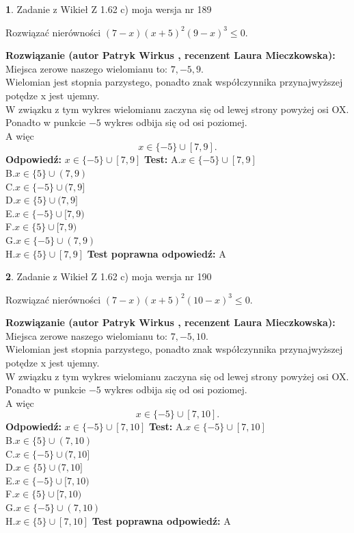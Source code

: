 \documentclass[12pt, a4paper]{article}
\theoremstyle{definition} %
\newtheorem{zad}{}
\newcommand{\zadStart}[1]{\begin{zad}#1\newline}
\newcommand{\zadStop}{\end{zad}}
\newcommand{\rozwStart}[2]{\noindent \textbf{Rozwiązanie (autor #1 , recenzent #2): }\newline}
\newcommand{\rozwStop}{\newline}
\newcommand{\odpStart}{\noindent \textbf{Odpowiedź:}\newline}
\newcommand{\odpStop}{\newline}
\newcommand{\testStart}{\noindent \textbf{Test:}\newline}
\newcommand{\testStop}{\newline}
\newcommand{\kluczStart}{\noindent \textbf{Test poprawna odpowiedź:}\newline}
\newcommand{\kluczStop}{\newline}
\begin{document}
\zadStart{Zadanie z Wikieł Z 1.62 c) moja wersja nr 189}

Rozwiązać nierówności $(7-x)(x+5)^{2}(9-x)^{3}\le0$.
\zadStop
\rozwStart{Patryk Wirkus}{Laura Mieczkowska}
Miejsca zerowe naszego wielomianu to: $7, -5, 9$.\\
Wielomian jest stopnia parzystego, ponadto znak współczynnika przy\linebreak najwyższej potędze x jest ujemny.\\ W związku z tym wykres wielomianu zaczyna się od lewej strony powyżej osi OX.\\
Ponadto w punkcie $-5$ wykres odbija się od osi poziomej.\\
A więc $$x \in \{-5\} \cup [7,9].$$
\rozwStop
\odpStart
$x \in \{-5\} \cup [7,9]$
\odpStop
\testStart
A.$x \in \{-5\} \cup [7,9]$\\
B.$x \in \{5\} \cup (7,9)$\\
C.$x \in \{-5\} \cup (7,9]$\\
D.$x \in \{5\} \cup (7,9]$\\
E.$x \in \{-5\} \cup [7,9)$\\
F.$x \in \{5\} \cup [7,9)$\\
G.$x \in \{-5\} \cup (7,9)$\\
H.$x \in \{5\} \cup [7,9]$
\testStop
\kluczStart
A
\kluczStop



\zadStart{Zadanie z Wikieł Z 1.62 c) moja wersja nr 190}

Rozwiązać nierówności $(7-x)(x+5)^{2}(10-x)^{3}\le0$.
\zadStop
\rozwStart{Patryk Wirkus}{Laura Mieczkowska}
Miejsca zerowe naszego wielomianu to: $7, -5, 10$.\\
Wielomian jest stopnia parzystego, ponadto znak współczynnika przy\linebreak najwyższej potędze x jest ujemny.\\ W związku z tym wykres wielomianu zaczyna się od lewej strony powyżej osi OX.\\
Ponadto w punkcie $-5$ wykres odbija się od osi poziomej.\\
A więc $$x \in \{-5\} \cup [7,10].$$
\rozwStop
\odpStart
$x \in \{-5\} \cup [7,10]$
\odpStop
\testStart
A.$x \in \{-5\} \cup [7,10]$\\
B.$x \in \{5\} \cup (7,10)$\\
C.$x \in \{-5\} \cup (7,10]$\\
D.$x \in \{5\} \cup (7,10]$\\
E.$x \in \{-5\} \cup [7,10)$\\
F.$x \in \{5\} \cup [7,10)$\\
G.$x \in \{-5\} \cup (7,10)$\\
H.$x \in \{5\} \cup [7,10]$
\testStop
\kluczStart
A
\kluczStop
\end{document}
